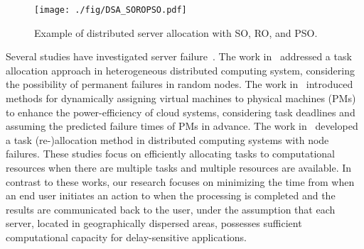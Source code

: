 \documentclass[10pt, letterpaper]{IEEEtran}
\begin{document}
\begin{CJK}{UTF8}{ipxm}
\begin{figure}[tb]
  \begin{center}
      \texttt{[image: ./fig/DSA\_SOROPSO.pdf]}
  \end{center}
  \caption{Example of distributed server allocation with SO, RO, and PSO.}
  \label{fig:DSA_SOROPSO}
\end{figure}

Several studies have investigated server failure~\cite{ImanakaTNSM27,ImanakaTNSM28,ImanakaTNSM29}.
The work in~\cite{ImanakaTNSM27} addressed a task allocation approach in heterogeneous distributed computing system, considering the possibility of permanent failures in random nodes.
The work in~\cite{ImanakaTNSM28} introduced methods for dynamically assigning virtual machines to physical machines (PMs) to enhance the power-efficiency of cloud systems, considering task deadlines and assuming the predicted failure times of PMs in advance.
The work in~\cite{ImanakaTNSM29} developed a task (re-)allocation method in distributed computing systems with node failures.
% 
These studies focus on efficiently allocating tasks to computational resources when there are multiple tasks and multiple resources are available.
In contrast to these works, our research focuses on minimizing the time from when an end user initiates an action to when the processing is completed and the results are communicated back to the user, under the assumption that each server, located in geographically dispersed areas, possesses sufficient computational capacity for delay-sensitive applications.


\end{CJK}
\end{document}

